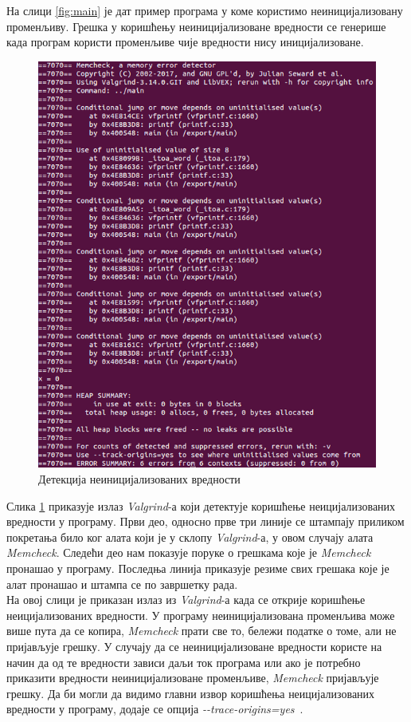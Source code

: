 \documentclass[12pt,oneside]{memoir}
\begin{document}
\indent На слици \ref{fig:main} је дат пример програма у коме користимо неиницијализовану променљиву. Грешка у коришћењу неиницијализоване вредности се генерише када програм користи променљиве чије вредности нису иницијализоване.

\begin{figure}[h!]
\begin{center}
\includegraphics[scale=0.75]{slika2.png}
\end{center}
\caption{Детекција неиницијализованих вредности}
\label{fig:memcheck}
\end{figure}

\indent Слика \ref{fig:memcheck} приказује излаз \textit{Valgrind}-а који детектује коришћење неицијализованих вредности у програму. Први део, односно прве три линије се штампају приликом покретања било ког алата који је у склопу \textit{Valgrind}-а, у овом случају алата \textit{Memcheck}. Следећи део нам показује поруке о грешкама које је \textit{Memcheck} пронашао у програму. Последња линија приказује резиме свих грешака које је алат пронашао и штампа се по завршетку рада. \\
\indent На овој слици је приказан излаз из \textit{Valgrind}-а када се открије  коришћење неицијализованих вредности. У програму неиницијализована променљива може више пута да се копира, \textit{Memcheck} прати све то, бележи податке о томе, али не пријављује грешку. У случају да се неиницијализоване вредности користе на начин да од те вредности зависи даљи ток програма или ако је потребно приказити вредности неиницијализоване променљиве, \textit{Memcheck} пријављује грешку. Да би могли да видимо главни извор коришћења неицијализованих вредности у програму, додаје се опција \textit{-\--trace-origins=yes}~\cite{memcheckRef}.
\end{document}
